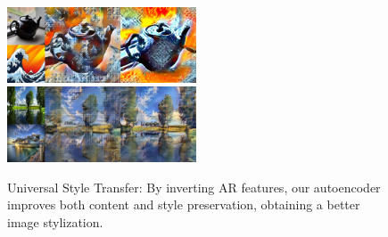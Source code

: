 \begin{figure}[t]
\begin{minipage}{0.1\textwidth}
\centering\textbf{\colorbox{white}{}}
\end{minipage}\begin{minipage}[t]{0.2\textwidth}
\centering \textbf{\colorbox{white}{}}
\end{minipage}\begin{minipage}[t]{0.21\textwidth}
\centering \textbf{\colorbox{white}{}}
\end{minipage}\begin{minipage}[t]{0.1\textwidth}
\centering\textbf{\colorbox{white}{}}
\end{minipage}\begin{minipage}[t]{0.2\textwidth}
\centering \textbf{\colorbox{white}{}}
\end{minipage}\begin{minipage}[t]{0.2\textwidth}
\centering \textbf{\colorbox{white}{}}
\end{minipage}

\vspace{-0.1 cm}
\includegraphics[width=0.5\textwidth]{figs/st/st_tile05.jpg}
\includegraphics[width=0.5\textwidth]{figs/st/st_tile03.jpg}

\caption{\label{fig:style01}Universal Style Transfer: By inverting AR features, our autoencoder improves both content and style preservation, obtaining a better image stylization.}
\vspace{-0.7 cm}
\end{figure}
